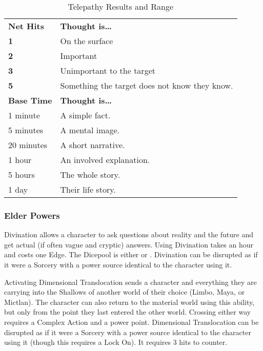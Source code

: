 \begin{table}[htb]
 \caption{Telepathy Results and Range} \centering
\begin{tabular}{l l}
\textbf{Net Hits} & \textbf{Thought is\ldots{}}\\
\textbf{1} & On the surface\\
\textbf{2} & Important\\
\textbf{3} & Unimportant to the target\\
\textbf{5} & Something the target does not know they know.\\
\textbf{Base Time} & \textbf{Thought is\ldots{}}\\
1 minute & A simple fact.\\
5 minutes & A mental image.\\
20 minutes & A short narrative.\\
1 hour & An involved explanation.\\
5 hours & The whole story.\\
1 day & Their life story.\\
\end{tabular}
\end{table}

\subsubsection{Elder Powers}

 Divination allows a character to ask questions about reality and the future and get actual (if often vague and cryptic) answers. Using Divination takes an hour and costs one Edge.  The Dicepool is either  or . Divination can be disrupted as if it were a Sorcery with a power source identical to the character using it.

 Activating Dimensional Translocation sends a character and everything they are carrying into the Shallows of another world of their choice (Limbo, Maya, or Mictlan). The character can also return to the material world using this ability, but only from the point they last entered the other world. Crossing either way requires a Complex Action and a power point. Dimensional Translocation can be disrupted as if it were a Sorcery with a power source identical to the character using it (though this requires a Lock On). It requires 3 hits to counter.


